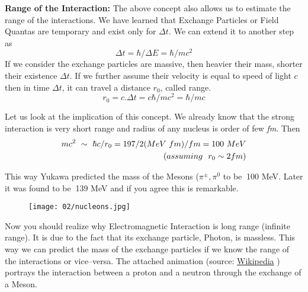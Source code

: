          \par{\textbf{Range of the Interaction:} The above concept also allows us to estimate the range of the interactions. We have learned that Exchange Particles or Field Quantas are temporary and exist only for $\Delta t $. We can extend it to another step as     \begin{equation}
                \Delta t = \hbar/ \Delta E = \hbar/mc^2
            \end{equation} 
         If we consider the exchange particles are massive, then heavier their mass, shorter their existence $\Delta t $. If we further assume their velocity is equal to speed of light $c$ then in time $\Delta t $, it can travel a distance $r_0$, called range.}
             \begin{equation}
             r_0 = c. \Delta t = c \hbar/mc^2 = \hbar /mc
             \end{equation}
         \par Let us look at the implication of this concept. We already know that the strong interaction is very short range and radius of any nucleus is order of few \textit{fm}. Then
         \begin{equation}
         \begin{split}
                    mc^2~\sim~\hbar c /r_0 = 197/2 (MeV~fm)/fm =100~MeV
                    \\\textrm (assuming~~r_0 \sim 2fm)
         \end{split}
         \end{equation}
        \par This way Yukawa predicted the mass of the Mesons ($\pi^\pm , \pi^0$ to be $~$100 MeV. Later it was found to be $~$139 MeV and if you agree this is remarkable.
        
        \begin{wrapfigure}{r}{0.45\textwidth}
        \centering
        \texttt{[image: 02/nucleons.jpg]}
        \label{fig:nucleons}
        \end{wrapfigure}
        
    Now you should realize why Electromagnetic Interaction is long range (infinite range). It is due to the fact that its exchange particle, Photon, is massless. This way we can predict the mass of the exchange particles if we know the range of the interactions or vice–versa. The attached animation (source: \href{https://en.wikipedia.org/wiki/Nuclear_force}{Wikipedia} ) portrays the interaction between a proton and a neutron through the exchange of a Meson.

